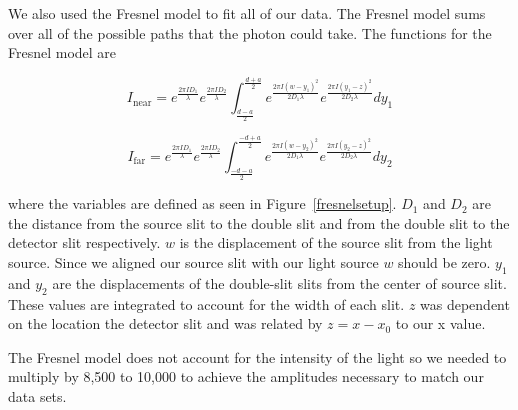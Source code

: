 \documentclass[prb,preprint]{revtex4-1}
\begin{document}
We also used the Fresnel model to fit all of our data. The Fresnel model sums over all of the possible paths that the photon could take. The functions for the Fresnel model are

\begin{equation}
\label{fresnelnear}
I_\text{near} = e^{\frac{2 \pi I D_1}{\lambda}} e^{\frac{2 \pi I D_2}{\lambda}} \int_\frac{d-a}{2}^\frac{d+a}{2} e^{\frac{2 \pi I (w-y_1)^2}{2 D_1 \lambda}} e^{\frac{2 \pi I (y_1-z)^2}{2 D_2 \lambda}} dy_1
\end{equation}

\begin{equation}
\label{fresnelfar}
I_\text{far} = e^{\frac{2 \pi I D_1}{\lambda}} e^{\frac{2 \pi I D_2}{\lambda}} \int_\frac{-d-a}{2}^\frac{-d+a}{2} e^{\frac{2 \pi I (w-y_2)^2}{2 D_1 \lambda}} e^{\frac{2 \pi I (y_2-z)^2}{2 D_2 \lambda}} dy_2
\end{equation}

where the variables are defined as seen in Figure~\ref{fresnelsetup}. $D_1$ and $D_2$ are the distance from the source slit to the double slit and from the double slit to the detector slit respectively. $w$ is the displacement of the source slit from the light source. Since we aligned our source slit with our light source $w$ should be zero. $y_1$ and $y_2$ are the displacements of the double-slit slits from the center of source slit. These values are integrated to account for the width of each slit. $z$ was dependent on the location the detector slit and was related by $z = x - x_0$ to our x value.

The Fresnel model does not account for the intensity of the light so we needed to multiply by 8,500 to 10,000 to achieve the amplitudes necessary to match our data sets.
\end{document}
